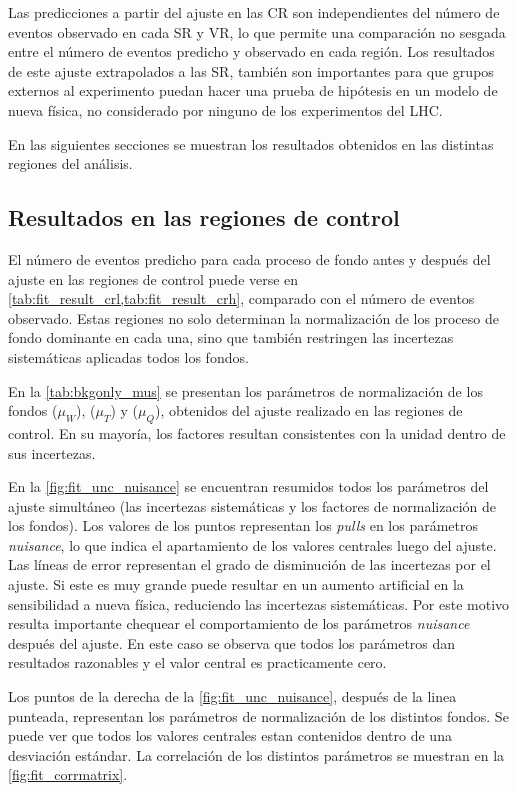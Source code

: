 Las predicciones a partir del ajuste en las CR son independientes del número de
eventos observado en cada SR y VR, lo que permite una comparación no sesgada
entre el número de eventos predicho y observado en cada región. Los resultados
de este ajuste extrapolados a las SR, también son importantes para que grupos
externos al experimento puedan hacer una prueba de hipótesis en un modelo de
nueva física, no considerado por ninguno de los experimentos del LHC.

En las siguientes secciones se muestran los resultados obtenidos en las
distintas regiones del análisis.


\subsection{Resultados en las regiones de control}

El número de eventos predicho para cada proceso de fondo antes y después del ajuste en
las regiones de control puede verse en \cref{tab:fit_result_crl,tab:fit_result_crh},
comparado con el número de eventos observado.
Estas regiones no solo determinan la normalización de los proceso de fondo dominante
en cada una, sino que también restringen las incertezas sistemáticas aplicadas todos
los fondos.

En la \cref{tab:bkgonly_mus} se presentan los parámetros de normalización de
los fondos {\wgam} ($\mu_W$), {\ttgam} ($\mu_T$) y {\gjet}
($\mu_Q$), obtenidos del ajuste realizado en las regiones de control.
En su mayoría, los factores resultan consistentes con la unidad dentro de sus incertezas.

En la \cref{fig:fit_unc_nuisance} se encuentran resumidos todos los parámetros
del ajuste simultáneo (las incertezas sistemáticas y los factores de
normalización de los fondos). Los valores de los puntos representan los
\emph{pulls} en los parámetros \emph{nuisance}, lo que indica el apartamiento de los valores
centrales luego del ajuste. Las líneas de error representan el
 grado de disminución de las incertezas por el
ajuste. Si este es muy grande puede resultar en un aumento artificial
en la sensibilidad a nueva física, reduciendo las incertezas sistemáticas.
Por este motivo resulta importante
chequear el comportamiento de los parámetros \emph{nuisance} después del ajuste.
En este caso se observa que todos los parámetros dan resultados razonables
y el valor central es practicamente cero.

Los puntos de la derecha de la \cref{fig:fit_unc_nuisance}, después de la linea
punteada, representan los parámetros de normalización de los distintos fondos. Se
puede ver que todos los valores centrales estan contenidos dentro de una desviación estándar.
La correlación de los distintos parámetros se muestran en la \cref{fig:fit_corrmatrix}.

